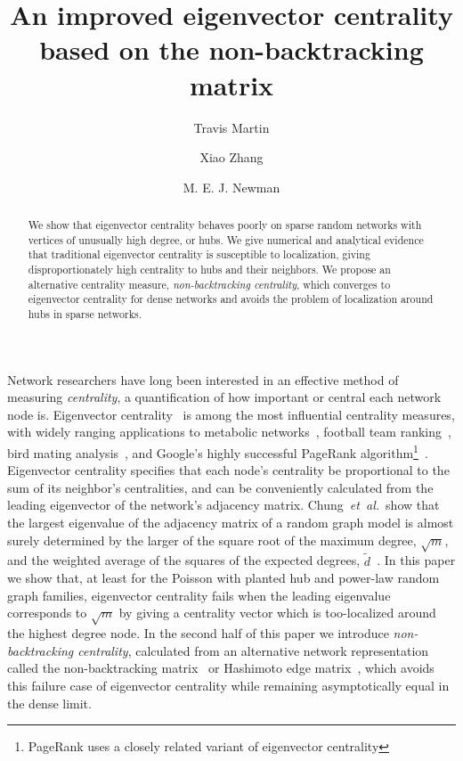 \documentclass[twocolumn,prl,superscriptaddress]{revtex4}
\newcommand{\etal}{{\it{}et~al.}}
\begin{document}
\title{An improved eigenvector centrality based on the non-backtracking matrix}
\author{Travis Martin}
\author{Xiao Zhang}
\author{M. E. J. Newman}

\begin{abstract}
  We show that eigenvector centrality behaves poorly on sparse random networks with vertices of unusually high degree, or hubs. We give numerical and analytical evidence that traditional eigenvector centrality is susceptible to localization, giving disproportionately high centrality to hubs and their neighbors. We propose an alternative centrality measure, \emph{non-backtracking centrality}, which converges to eigenvector centrality for dense networks and avoids the problem of localization around hubs in sparse networks.
\end{abstract}

\maketitle

Network researchers have long been interested in an effective method of measuring \emph{centrality}, a quantification of how important or central each network node is. Eigenvector centrality~\cite{bonacich72} is among the most influential centrality measures, with widely ranging applications to metabolic networks~\cite{ding10}, football team ranking~\cite{keener93}, bird mating analysis~\cite{ryder08}, and Google's highly successful PageRank algorithm\footnote{PageRank uses a closely related variant of eigenvector centrality}~\cite{page99}. Eigenvector centrality specifies that each node's centrality be proportional to the sum of its neighbor's centralities, and can be conveniently calculated from the leading eigenvector of the network's adjacency matrix. Chung~\etal\ show that the largest eigenvalue of the adjacency matrix of a random graph model is almost surely determined by the larger of the square root of the maximum degree, $\sqrt{m}$, and the weighted average of the squares of the expected degrees, $\tilde{d}$~\cite{chung03}. In this paper we show that, at least for the Poisson with planted hub and power-law random graph families, eigenvector centrality fails when the leading eigenvalue corresponds to $\sqrt{m}$ by giving a centrality vector which is too-localized around the highest degree node. In the second half of this paper we introduce \emph{non-backtracking centrality}, calculated from an alternative network representation called the non-backtracking matrix~\cite{krzakala13} or Hashimoto edge matrix~\cite{hashimoto89}, which avoids this failure case of eigenvector centrality while remaining asymptotically equal in the dense limit.
\end{document}
